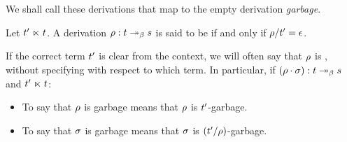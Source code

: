 
We shall call these derivations that map to the empty derivation \emph{garbage}.

\begin{definition}[Garbage]
Let $t' \mathrel{\ltimes} t$.
A derivation $\rho : t \mathrel{\twoheadrightarrow_\beta} s$ is said to be 
if and only if $\rho/t' = \epsilon$.
\end{definition}

\begin{notation}
If the correct term $t'$ is clear from the context,
we will often say that $\rho$ is ,
without specifying with respect to which term.
In particular, if $(\rho \cdot \sigma) : t \mathrel{\twoheadrightarrow_\beta} s$
and $t' \mathrel{\ltimes} t$:
  \begin{itemize}
  \item To say that $\rho$ is garbage means that $\rho$ is $t'$-garbage.
  \item To say that $\sigma$ is garbage means that $\sigma$ is $(t'/\rho)$-garbage.
  \end{itemize}
\end{notation}

